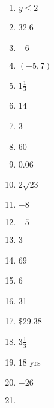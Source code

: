 \documentclass[../uilmath.tex]{subfiles}
\begin{document}
\begin{enumerate}[label=\bfseries\arabic*.]
    \item %
    $y\leq 2$

    \item %
    32.6

    \item %
    $-6$

    \item %
    $(-5,7)$

    \item %
    $1\frac{1}{3}$

    \item %
    14

    \item %
    3

    \item %
    $60$

    \item %
    0.06

    \item %
    $2\sqrt{23}$

    \item %
    $-8$

    \item %
    $-5$

    \item %
    3

    \item %
    69

    \item %
    6

    \item %
    31

    \item %
    \$29.38

    \item %
    $3\frac{1}{3}$

    \item %
    18 yrs 

    \item %
    $-26$

    \item %
    
\end{enumerate}
\end{document}
